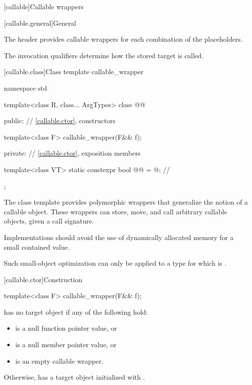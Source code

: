 [callable]{Callable wrappers}

[callable.general]{General}

\pnum
The header provides callable wrappers for each combination of the placeholders.

\pnum
The invocation qualifiers determine how the stored target is called.

[callable.class]{Class template callable_wrapper}

\begin{codeblock}
namespace std {
  template<class R, class... ArgTypes>
  class @@ {
  public:
    // \ref{callable.ctor}, constructors

    template<class F> callable_wrapper(F&& f);

  private:
    // \ref{callable.ctor}, exposition members

    template<class VT>
    static constexpr bool @@ = @\seebelow@; // \expos
  };
}
\end{codeblock}

\pnum
The  class template provides polymorphic wrappers that generalize the notion of a callable object. These wrappers can store, move, and call arbitrary callable objects, given a call signature.

\pnum
\recommended
Implementations should avoid the use of dynamically allocated memory for a small contained value.
\begin{note}
Such small-object optimization can only be applied to a type  for which  is .
\end{note}

[callable.ctor]{Construction}

%
\begin{itemdecl}
template<class F>
  callable_wrapper(F&& f);
\end{itemdecl}

\begin{itemdescr}
\pnum
\ensures
{} has no target object if any of the following hold:
\begin{itemize}
\item {} is a null function pointer value, or
\item {} is a null member pointer value, or
\item {} is an empty callable wrapper.
\end{itemize}
Otherwise,  has a target object initialized with .
\end{itemdescr}

